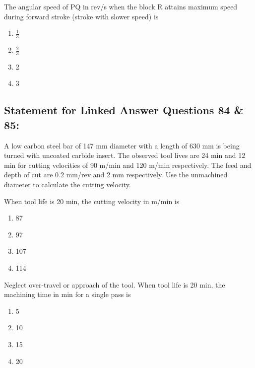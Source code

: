     \item The angular speed of PQ in rev/s when the block R attains maximum speed during forward stroke (stroke with slower speed) is
    \begin{enumerate}
	\item $\frac{1}{3}$
	\item $\frac{2}{3}$
        \item 2
        \item 3
    \end{enumerate}

\subsection{Statement for Linked Answer Questions 84 \& 85:}

A low carbon steel bar of 147 mm diameter with a length of 630 mm is being turned with uncoated carbide insert. The observed tool lives are 24 min and 12 min for cutting velocities of 90 m/min and 120 m/min respectively. The feed and depth of cut are 0.2 mm/rev and 2 mm respectively. Use the unmachined diameter to calculate the cutting velocity.

    \item When tool life is 20 min, the cutting velocity in m/min is
    \begin{enumerate}
        \item 87
        \item 97
        \item 107
        \item 114
    \end{enumerate}
    
    \item Neglect over-travel or approach of the tool. When tool life is 20 min, the machining time in min for a single pass is
    \begin{enumerate}
        \item 5
        \item 10
        \item 15
        \item 20
    \end{enumerate}
